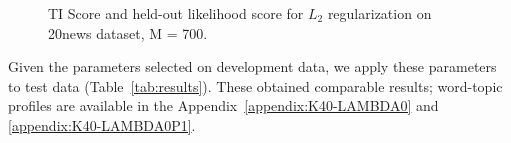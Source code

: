 \documentclass{article}
\begin{document}
\begin{figure}[t!]
\hspace{0.1in}
\caption{TI Score and held-out likelihood score for $L_2$ regularization on 20news dataset, M = 700.}
\label{fig:select-lambda}
\end{figure}

Given the parameters selected on development data, we apply these parameters to
test data (Table~\ref{tab:results}).  These obtained comparable results;
word-topic profiles are available in the Appendix~\ref{appendix:K40-LAMBDA0} and \ref{appendix:K40-LAMBDA0P1}.
\end{document}
